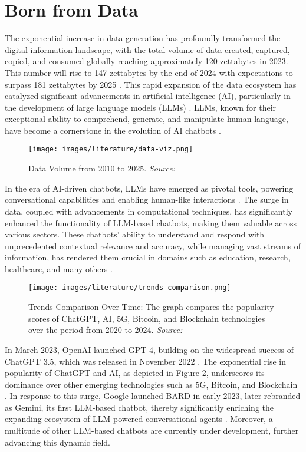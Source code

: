 \section{Born from Data}

The exponential increase in data generation has profoundly transformed the digital information landscape, with the total volume of data created, captured, copied, and consumed globally reaching approximately 120 zettabytes in 2023. This number will rise to 147 zettabytes by the end of 2024 with expectations to surpass 181 zettabytes by 2025 \cite{taylor2023volume}. This rapid expansion of the data ecosystem has catalyzed significant advancements in artificial intelligence (AI), particularly in the development of large language models (LLMs) \cite{zhao2023survey}. LLMs, known for their exceptional ability to comprehend, generate, and manipulate human language, have become a cornerstone in the evolution of AI chatbots \cite{brown2020language}.

\begin{figure}[h!]
    \centering
    \texttt{[image: images/literature/data-viz.png]}
    \caption{Data Volume from 2010 to 2025. \textit{Source:} \cite{taylor2023volume}}
    \label{fig:data_volume}
\end{figure}

In the era of AI-driven chatbots, LLMs have emerged as pivotal tools, powering conversational capabilities and enabling human-like interactions \cite{koubaa2023exploring}. The surge in data, coupled with advancements in computational techniques, has significantly enhanced the functionality of LLM-based chatbots, making them valuable across various sectors. These chatbots' ability to understand and respond with unprecedented contextual relevance and accuracy, while managing vast streams of information, has rendered them crucial in domains such as education, research, healthcare, and many others \cite{dam2024complete}.

\begin{figure}[h!]
    \centering
    \texttt{[image: images/literature/trends-comparison.png]}
    \caption{Trends Comparison Over Time: The graph compares the popularity scores of ChatGPT, AI, 5G, Bitcoin, and Blockchain technologies over the period from 2020 to 2024. \textit{Source:} \cite{googletrends2023}}
    \label{fig:chatgpt_popularity}
\end{figure}

In March 2023, OpenAI launched GPT-4, building on the widespread success of ChatGPT 3.5, which was released in November 2022 \cite{bahrini2023chatgpt, zhang2023one}. The exponential rise in popularity of ChatGPT and AI, as depicted in Figure \ref{fig:chatgpt_popularity}, underscores its dominance over other emerging technologies such as 5G, Bitcoin, and Blockchain \cite{googletrends2023}. In response to this surge, Google launched BARD in early 2023, later rebranded as Gemini, its first LLM-based chatbot, thereby significantly enriching the expanding ecosystem of LLM-powered conversational agents \cite{wikipedia2024gemini}. Moreover, a multitude of other LLM-based chatbots are currently under development, further advancing this dynamic field.

